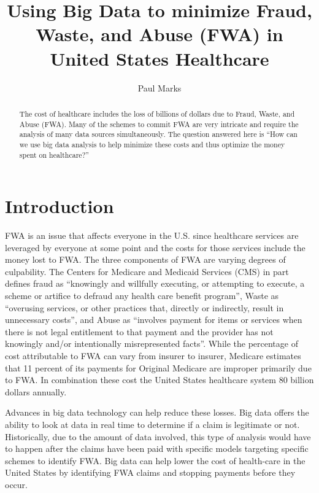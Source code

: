 \documentclass[sigconf]{acmart}
\begin{document}
\title{Using Big Data to minimize Fraud, Waste, and Abuse (FWA) in United States Healthcare}


\author{Paul Marks}


\begin{abstract}
The cost of healthcare includes the loss of billions of dollars due to Fraud, 
Waste, and Abuse (FWA).  Many of the schemes to commit FWA are very intricate and 
require the analysis of many data sources simultaneously.  The question answered 
here is ``How can we use big data analysis to help minimize these costs and thus 
optimize the money spent on healthcare?''
\end{abstract}



\maketitle

\section{Introduction}

FWA is an issue that affects everyone in the U.S. since healthcare services are 
leveraged by everyone at some point and the costs for those services include the 
money lost to FWA.  The three components of FWA are varying degrees of 
culpability.  The Centers for Medicare and Medicaid Services (CMS) in part defines 
fraud as ``knowingly and willfully executing, or attempting to execute, a scheme or 
artifice to defraud any health care benefit program'', Waste as ``overusing services, 
or other practices that, directly or indirectly, result in unnecessary costs'', and 
Abuse as ``involves payment for items or services when there is not legal entitlement 
to that payment and the provider has not knowingly and/or intentionally 
misrepresented facts''.\cite{MLNFWA}  While the percentage of cost attributable to 
FWA can vary from insurer to insurer, Medicare estimates that 11 percent of its 
payments for Original Medicare are improper primarily due to FWA.\cite{FY2016HHSFR}  
In combination these cost the United States healthcare system 80 billion 
dollars\cite{HFMA} annually.  

Advances in big data technology can help reduce these losses.  Big data offers the 
ability to look at data in real time to determine if a claim is legitimate or not.  
Historically, due to the amount of data involved, this type of analysis would have to 
happen after the claims have been paid with specific models targeting specific 
schemes to identify FWA.  Big data can help lower the cost of health-care in the 
United States by identifying FWA claims and stopping payments before they occur. 
\end{document}
